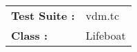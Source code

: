 










































































































\begin{tabular}{p{25mm}l}
{\bf Test Suite :} & vdm.tc \\ 
{\bf Class :} & Lifeboat \\ 
\end{tabular}

